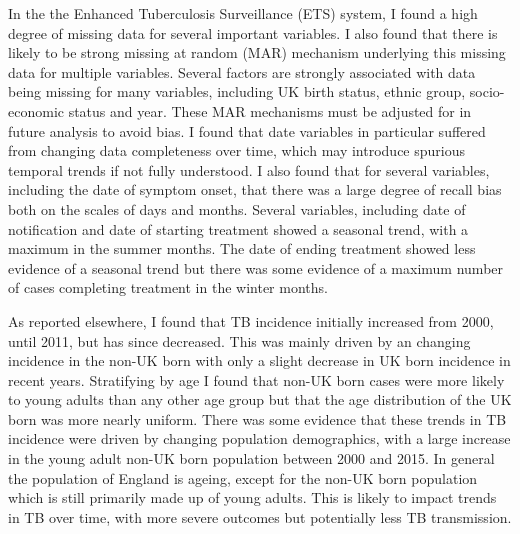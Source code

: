 \documentclass[11pt,twoside]{bristolthesis}
\begin{document}
  In the the Enhanced Tuberculosis Surveillance (ETS) system, I found a high degree of missing data for several important variables. I also found that there is likely to be strong missing at random (MAR) mechanism underlying this missing data for multiple variables. Several factors are strongly associated with data being missing for many variables, including UK birth status, ethnic group, socio-economic status and year. These MAR mechanisms must be adjusted for in future analysis to avoid bias. I found that date variables in particular suffered from changing data completeness over time, which may introduce spurious temporal trends if not fully understood. I also found that for several variables, including the date of symptom onset, that there was a large degree of recall bias both on the scales of days and months. Several variables, including date of notification and date of starting treatment showed a seasonal trend, with a maximum in the summer months. The date of ending treatment showed less evidence of a seasonal trend but there was some evidence of a maximum number of cases completing treatment in the winter months.
  
  As reported elsewhere, I found that TB incidence initially increased from 2000, until 2011, but has since decreased. This was mainly driven by an changing incidence in the non-UK born with only a slight decrease in UK born incidence in recent years. Stratifying by age I found that non-UK born cases were more likely to young adults than any other age group but that the age distribution of the UK born was more nearly uniform. There was some evidence that these trends in TB incidence were driven by changing population demographics, with a large increase in the young adult non-UK born population between 2000 and 2015. In general the population of England is ageing, except for the non-UK born population which is still primarily made up of young adults. This is likely to impact trends in TB over time, with more severe outcomes but potentially less TB transmission.
  
\end{document}
